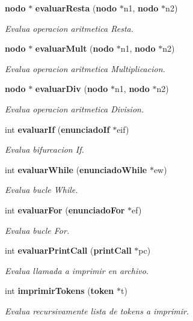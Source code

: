 \begin{CompactItemize}
{\bf nodo} $\ast$ {\bf evaluar\-Resta} ({\bf nodo} $\ast$n1, {\bf nodo} $\ast$n2)
\begin{CompactList}\small\item\em Evalua operacion aritmetica Resta. \item\end{CompactList}\item 
{\bf nodo} $\ast$ {\bf evaluar\-Mult} ({\bf nodo} $\ast$n1, {\bf nodo} $\ast$n2)
\begin{CompactList}\small\item\em Evalua operacion aritmetica Multiplicacion. \item\end{CompactList}\item 
{\bf nodo} $\ast$ {\bf evaluar\-Div} ({\bf nodo} $\ast$n1, {\bf nodo} $\ast$n2)
\begin{CompactList}\small\item\em Evalua operacion aritmetica Division. \item\end{CompactList}\item 
int {\bf evaluar\-If} ({\bf enunciado\-If} $\ast$eif)
\begin{CompactList}\small\item\em Evalua bifurcacion If. \item\end{CompactList}\item 
int {\bf evaluar\-While} ({\bf enunciado\-While} $\ast$ew)
\begin{CompactList}\small\item\em Evalua bucle While. \item\end{CompactList}\item 
int {\bf evaluar\-For} ({\bf enunciado\-For} $\ast$ef)
\begin{CompactList}\small\item\em Evalua bucle For. \item\end{CompactList}\item 
int {\bf evaluar\-Print\-Call} ({\bf print\-Call} $\ast$pc)
\begin{CompactList}\small\item\em Evalua llamada a imprimir en archivo. \item\end{CompactList}\item 
int {\bf imprimir\-Tokens} ({\bf token} $\ast$t)
\begin{CompactList}\small\item\em Evalua recursivamente lista de tokens a imprimir. \item\end{CompactList}\item 

\end{CompactItemize}
